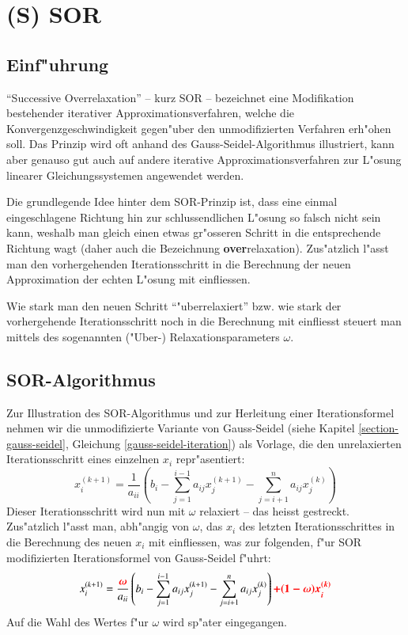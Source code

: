 \chapter{(S) SOR}
\begin{refsection}

\section{Einf"uhrung}
``Successive Overrelaxation'' -- kurz SOR -- bezeichnet eine
Modifikation bestehender iterativer Approximationsverfahren, welche
die Konvergenzgeschwindigkeit gegen"uber den unmodifizierten Verfahren
erh"ohen soll. Das Prinzip wird oft anhand des Gauss-Seidel-Algorithmus
illustriert, kann aber genauso gut auch auf andere iterative
Approximationsverfahren zur L"osung linearer Gleichungssystemen angewendet
werden.

Die grundlegende Idee hinter dem SOR-Prinzip ist, dass eine einmal
eingeschlagene Richtung hin zur schlussendlichen L"osung so falsch
nicht sein kann, weshalb man gleich einen etwas gr"osseren Schritt
in die entsprechende Richtung wagt (daher auch die Bezeichnung
\textbf{over}relaxation). Zus"atzlich l"asst man den vorhergehenden
Iterationsschritt in die Berechnung der neuen Approximation der echten
L"osung mit einfliessen.

Wie stark man den neuen Schritt ``"uberrelaxiert'' bzw. wie stark der
vorhergehende Iterationsschritt noch in die Berechnung mit einfliesst
steuert man mittels des sogenannten ("Uber-) Relaxationsparameters
$\omega$.
	
\section{SOR-Algorithmus\label{sec: SOR-Alg.}}
Zur Illustration des SOR-Algorithmus und zur Herleitung einer
Iterationsformel nehmen wir die unmodifizierte Variante von
Gauss-Seidel (siehe Kapitel \ref{section-gauss-seidel}, Gleichung
\ref{gauss-seidel-iteration}) als Vorlage, die den unrelaxierten
Iterationsschritt eines einzelnen $x_i$ repr"asentiert:
\begin{equation} \label{eq: G.-S.-It.formel}
	x_i^{(k+1)} = \frac{1}{a_{ii}}\left(b_i-\sum\limits_{j=1}^{i-1} a_{ij}x_j^{(k+1)}-\sum\limits_{j=i+1}^na_{ij}x_j^{(k)}\right)
\end{equation}
Dieser Iterationsschritt wird nun mit $\omega$ relaxiert -- das heisst
gestreckt. Zus"atzlich l"asst man, abh"angig von $\omega$, das $x_i$
des letzten Iterationsschrittes in die Berechnung des neuen $x_i$ mit
einfliessen, was zur folgenden, f"ur SOR modifizierten Iterationsformel
von Gauss-Seidel f"uhrt:
\begin{equation} \label{eq: SOR-It.formel1}
	x_i^{(k+1)} = \frac{\boldsymbol{\textcolor{red}{\omega}}}{a_{ii}}\left(b_i-\sum\limits_{j=1}^{i-1}a_{ij}x_j^{(k+1)}-\sum\limits_{j=i+1}^n a_{ij}x_j^{(k)}\right)\boldsymbol{\textcolor{red}{+(1-\omega)x_i^{(k)}}}
\end{equation}
Auf die Wahl des Wertes f"ur $\omega$ wird sp"ater eingegangen.
		

\end{refsection}
